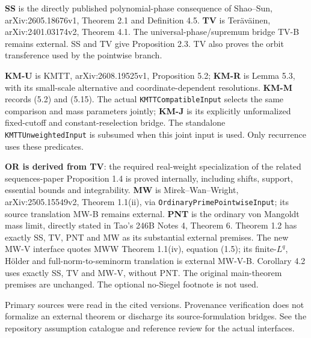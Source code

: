 \else
\textbf{SS} is the directly published polynomial-phase consequence of Shao--Sun, arXiv:2605.18676v1, Theorem 2.1 and Definition 4.5. \textbf{TV} is Ter\"av\"ainen, arXiv:2401.03174v2, Theorem 4.1. The universal-phase/supremum bridge TV-B remains external. SS and TV give Proposition 2.3. TV also proves the orbit transference used by the pointwise branch.

\textbf{KM-U} is KMTT, arXiv:2608.19525v1, Proposition 5.2; \textbf{KM-R} is Lemma 5.3, with its small-scale alternative and coordinate-dependent resolutions. \textbf{KM-M} records (5.2) and (5.15). The actual \texttt{KMTTCompatibleInput} selects the same comparison and mass parameters jointly; \textbf{KM-J} is its explicitly unformalized fixed-cutoff and constant-reselection bridge. The standalone \texttt{KMTTUnweightedInput} is subsumed when this joint input is used. Only recurrence uses these predicates.

\textbf{OR is derived from TV}: the required real-weight specialization of the related sequences-paper Proposition 1.4 is proved internally, including shifts, support, essential bounds and integrability. \textbf{MW} is Mirek--Wan--Wright, arXiv:2505.15549v2, Theorem 1.1(ii), via \texttt{OrdinaryPrimePointwiseInput}; its source translation MW-B remains external. \textbf{PNT} is the ordinary von Mangoldt mass limit, directly stated in Tao's 246B Notes 4, Theorem 6. Theorem 1.2 has exactly SS, TV, PNT and MW as its substantial external premises. The new MW-V interface quotes MWW Theorem 1.1(iv), equation (1.5); its finite-$L^q$, H\"older and full-norm-to-seminorm translation is external MW-V-B. Corollary 4.2 uses exactly SS, TV and MW-V, without PNT. The original main-theorem premises are unchanged. The optional no-Siegel footnote is not used.
\fi

Primary sources were read in the cited versions. Provenance verification does not formalize an external theorem or discharge its source-formulation bridges. See the repository assumption catalogue and reference review for the actual interfaces.
